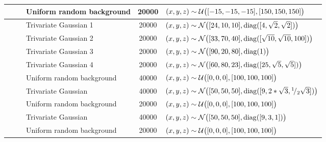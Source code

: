 \begin{tabular}{@{}cclS[table-format=+1.1e+1,scientific-notation=true,round-mode=places,round-precision=1]l@{}}
~ 				&\legendComponentNoise	& Uniform random background	& 20000		& $(x, y, z) \sim \mathcal{U}\big([-15, -15, -15], [150, 150, 150]\big)$\\
\hline
\baakmanThree	&\legendComponentOne 	& Trivariate Gaussian 1 	& 20000		& $(x, y, z) \sim \mathcal{N}\big([24, 10, 10], \operatorname{diag}([4, \sqrt{2}, \sqrt{2}])\big)$\\
~ 				&\legendComponentTwo	& Trivariate Gaussian 2 	& 20000		& $(x, y, z) \sim \mathcal{N}\big([33, 70, 40], \operatorname{diag}([\sqrt{10}, \sqrt{10}, 100])\big)$\\
~ 				&\legendComponentThree	& Trivariate Gaussian 3 	& 20000		& $(x, y, z) \sim \mathcal{N}\big([90, 20, 80], \operatorname{diag}(1)\big)$\\
~ 				&\legendComponentFour	& Trivariate Gaussian 4 	& 20000		& $(x, y, z) \sim \mathcal{N}\big([60, 80, 23], \operatorname{diag}([25, \sqrt{5}, \sqrt{5}])\big)$\\
~ 				&\legendComponentNoise	& Uniform random background	& 40000		& $(x, y, z) \sim \mathcal{U}\big([0, 0, 0], [100, 100, 100]\big)$\\
\hline
\baakmanFour	&\legendComponentOne	& Trivariate Gaussian 		& 40000		& $(x, y, z) \sim \mathcal{N}\big([50, 50, 50], \operatorname{diag}([9, 2 * \sqrt{3}, {}^{1}\!/_{2} \sqrt{3}])\big)$\\
~ 				&\legendComponentNoise	& Uniform random background	& 20000		& $(x, y, z) \sim \mathcal{U}\big([0, 0, 0], [100, 100, 100]\big)$\\
\hline
\baakmanFive	&\legendComponentOne	& Trivariate Gaussian 		& 40000		& $(x, y, z) \sim \mathcal{N}\big([50, 50, 50], \operatorname{diag}([9, 3, 1])\big)$\\
~ 				&\legendComponentNoise	& Uniform random background	& 20000		& $(x, y, z) \sim \mathcal{U}\big([0, 0, 0], [100, 100, 100]\big)$\\
\bottomrule
\end{tabular}